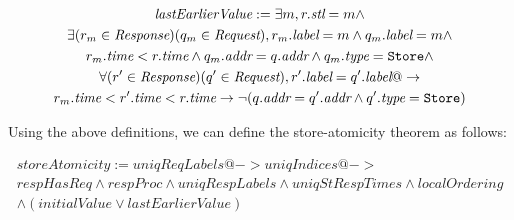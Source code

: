 \begin{defn}
\begin{multline*}
\textit{lastEarlierValue} :=
\exists m, r.\textit{stl} =  m \wedge \\
\exists (r_m \in \textit{Response}) (q_m \in \textit{Request}),
r_m.\textit{label} = m \wedge q_m.\textit{label} = m \wedge \\
r_m.\textit{time} < r.\textit{time} \wedge q_m.\textit{addr} = q.\textit{addr} \wedge q_m.\textit{type} = \texttt{Store} \wedge  \\
\forall (r' \in \textit{Response}) (q' \in \textit{Request}),
r'.\textit{label} = q'.\textit{label} @-> \\ r_m.\textit{time} < r'.\textit{time} < r.\textit{time} ->
\neg (q.\textit{addr} = q'.\textit{addr} \wedge q'.\textit{type} = \texttt{Store})
\end{multline*}
\end{defn}

Using the above definitions, we can define the store-atomicity theorem as follows:
\begin{thm}
\begin{multline*}
storeAtomicity := \textit{uniqReqLabels} @-> \textit{uniqIndices} @-> \\
\textit{respHasReq} \wedge \textit{respProc} \wedge \textit{uniqRespLabels} \wedge
\textit{uniqStRespTimes} \wedge \textit{localOrdering}\\ \wedge 
(\textit{initialValue} \vee \textit{lastEarlierValue})
\end{multline*}
\end{thm}
